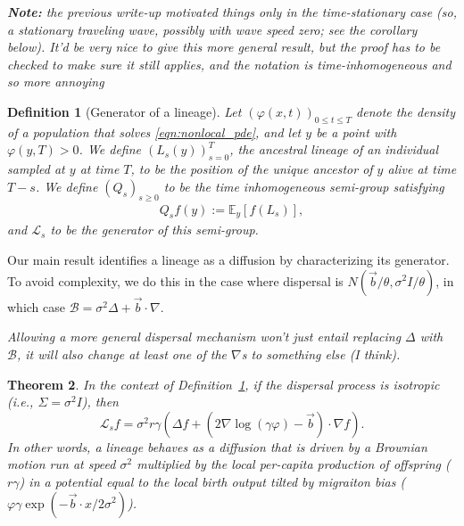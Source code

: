 \documentclass[12pt]{article}
\newtheorem{theorem}{Theorem}[section]
\newtheorem{definition}[theorem]{Definition}
\newcommand{\IE}{\mathbb E}
\newcommand{\grad}{\nabla}
\newcommand{\DG}{\mathcal{B}}  %
\newcommand{\meanq}{\vec b}    %
\newcommand{\covq}{\Sigma}     %
\newcommand{\Lgen}{\mathcal{L}}    %
\newcommand{\comment}[1]{{\color{blue} \it #1}}
\begin{document}
\comment{
    \textbf{Note:} the previous write-up motivated things only in the time-stationary case
    (so, a stationary traveling wave, possibly with wave speed zero;
    see the corollary below).
    It'd be very nice to give this more general result,
    but the proof has to be checked to make sure it still applies,
    and the notation is time-inhomogeneous and so more annoying
}


\begin{definition}[Generator of a lineage] \label{def:lineage_generator}
    Let $(\varphi(x, t))_{0 \le t \le T}$
    denote the density of a population that solves \eqref{eqn:nonlocal_pde},
    and let $y$ be a point with $\varphi(y, T) > 0$.
    We define $(L_s(y))_{s=0}^T$,
    the ancestral lineage of an individual sampled at $y$ at time $T$,
    to be the position of the unique ancestor of $y$ alive at time $T - s$.
    We define
    $(Q_s)_{s \geq 0}$
    to be the time inhomogeneous semi-group satisfying
    \begin{align*}
        Q_s f(y) := \IE_y[ f(L_s) ] ,
    \end{align*}
    and $\Lgen_s$ to be the generator of this semi-group.
\end{definition}

Our main result identifies a lineage as a diffusion
by characterizing its generator.
To avoid complexity,
we do this in the case where dispersal is $N(\meanq/\theta, \sigma^2 I/\theta)$,
in which case $\DG = \sigma^2 \Delta + \meanq \cdot \grad$.

\comment{
    Allowing a more general dispersal mechanism won't just entail replacing $\Delta$ with $\DG$,
    it will also change at least one of the $\grad$s to something else (I think).
}

\begin{theorem} \label{thm:lineages}
    In the context of Definition~\ref{def:lineage_generator},
    if the dispersal process is isotropic (i.e., $\covq = \sigma^2 I$),
    then
    \begin{equation}
        \label{eqn:lineage_generator}
        \Lgen_s f
        =
        \sigma^2 r \gamma
        \left(
            \Delta f
            +
            \left(
                2 \grad \log(\gamma \varphi)
                - \meanq
            \right)
            \cdot \grad f
        \right) .
    \end{equation}
    In other words, 
    a lineage behaves as a diffusion
    that is driven by a Brownian motion 
    run at speed $\sigma^2$ multiplied by the local per-capita production of offspring ($r \gamma$)
    in a potential equal to the local birth output tilted by migraiton bias
    ($\varphi \gamma \exp(-\meanq \cdot x / 2 \sigma^2)$).
\end{theorem}
\end{document}

